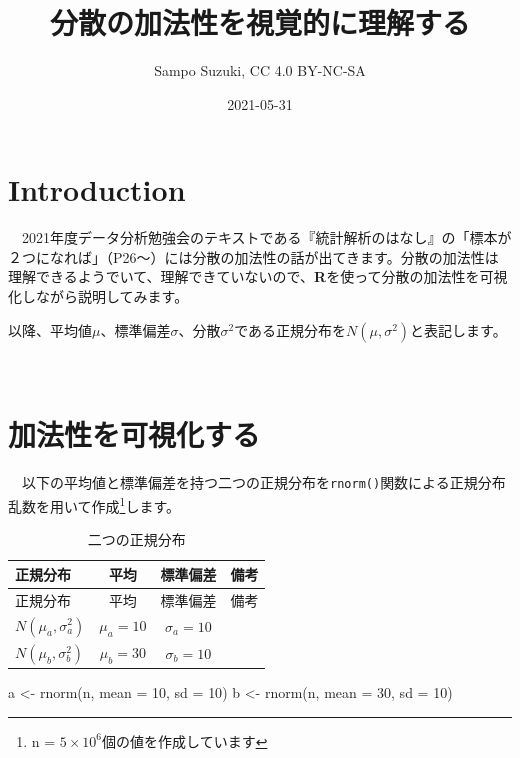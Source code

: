 \documentclass[]{tufte-handout}
\title[分散の加法性を視覚的に理解する]{分散の加法性を視覚的に理解する}
\author{Sampo Suzuki, CC 4.0 BY-NC-SA}
\date{2021-05-31}
\newenvironment{Shaded}{}{}
\newcommand{\AttributeTok}[1]{\textcolor[rgb]{0.49,0.56,0.16}{#1}}
\newcommand{\DecValTok}[1]{\textcolor[rgb]{0.25,0.63,0.44}{#1}}
\newcommand{\FunctionTok}[1]{\textcolor[rgb]{0.02,0.16,0.49}{#1}}
\newcommand{\NormalTok}[1]{#1}
\newcommand{\OtherTok}[1]{\textcolor[rgb]{0.00,0.44,0.13}{#1}}
\begin{document}
\maketitle




\hypertarget{introduction}{%
\section{\texorpdfstring{\textbf{Introduction}}{Introduction}}\label{introduction}}

　2021年度データ分析勉強会のテキストである『統計解析のはなし』\citep{ToukeiKaisekinoHanashi}の「標本が２つになれば」（P26〜）には分散の加法性の話が出てきます。分散の加法性は理解できるようでいて、理解できていないので、\textbf{R}を使って分散の加法性を可視化しながら説明してみます。

以降、平均値\(\mu\)、標準偏差\(\sigma\)、分散\(\sigma^2\)である正規分布を\(N(\mu, \sigma^2)\)と表記します。

　

\hypertarget{ux52a0ux6cd5ux6027ux3092ux53efux8996ux5316ux3059ux308b}{%
\section{\texorpdfstring{\textbf{加法性を可視化する}}{加法性を可視化する}}\label{ux52a0ux6cd5ux6027ux3092ux53efux8996ux5316ux3059ux308b}}

　以下の平均値と標準偏差を持つ二つの正規分布を\texttt{rnorm()}関数による正規分布乱数を用いて作成\footnote{n
  = \ensuremath{5\times 10^{6}}個の値を作成しています}します。

\begin{longtable}[]{@{}lccl@{}}
\caption{二つの正規分布}\tabularnewline
\toprule
正規分布 & 平均 & 標準偏差 & 備考 \\
\midrule
\endfirsthead
\toprule
正規分布 & 平均 & 標準偏差 & 備考 \\
\midrule
\endhead
\(N(\mu_a, \sigma^2_a)\) & \(\mu_a = 10\) & \(\sigma_a = 10\) & \\
\(N(\mu_b, \sigma^2_b)\) & \(\mu_b = 30\) & \(\sigma_b = 10\) & \\
\bottomrule
\end{longtable}

\begin{Shaded}
\begin{Highlighting}[numbers=left,,]
\NormalTok{a }\OtherTok{\textless{}{-}} \FunctionTok{rnorm}\NormalTok{(n, }\AttributeTok{mean =} \DecValTok{10}\NormalTok{, }\AttributeTok{sd =} \DecValTok{10}\NormalTok{)}
\NormalTok{b }\OtherTok{\textless{}{-}} \FunctionTok{rnorm}\NormalTok{(n, }\AttributeTok{mean =} \DecValTok{30}\NormalTok{, }\AttributeTok{sd =} \DecValTok{10}\NormalTok{)}
\end{Highlighting}
\end{Shaded}
\end{document}

